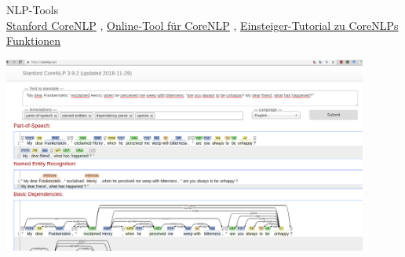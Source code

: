\begin{frame}[allowframebreaks]{NLP-Tools}
\footnotesize
{} \\
\href{https://stanfordnlp.github.io/CoreNLP/tutorials.html}{Stanford CoreNLP} \sep 
\href{https://corenlp.run/}{Online-Tool für CoreNLP} \sep 
\href{https://interviewbubble.com/getting-started-with-stanford-corenlp/}{Einsteiger-Tutorial zu CoreNLPs Funktionen}

\includegraphics[width=0.9\textwidth]{img/frankenstein-corenlp.png}


\end{frame}

